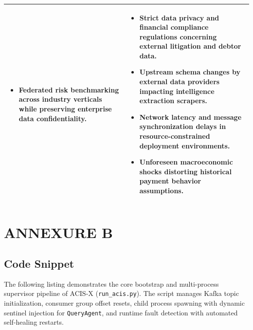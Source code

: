 \documentclass[a4paper, 12pt]{report}
\begin{document}
\begin{table}[H]
{\begin{tabular}{|p{7.3cm}|p{7.3cm}|}
\begin{itemize}[leftmargin=*, noitemsep, topsep=2pt, partopsep=0pt]
            \item Federated risk benchmarking across industry verticals while preserving enterprise data confidentiality.
        \end{itemize}
        &
        \begin{itemize}[leftmargin=*, noitemsep, topsep=2pt, partopsep=0pt]
            \item Strict data privacy and financial compliance regulations concerning external litigation and debtor data.
            \item Upstream schema changes by external data providers impacting intelligence extraction scrapers.
            \item Network latency and message synchronization delays in resource-constrained deployment environments.
            \item Unforeseen macroeconomic shocks distorting historical payment behavior assumptions.
        \end{itemize}
        \\[2pt]
        \hline
    \end{tabular}
    }
\end{table}

\clearpage
{}
\chapter*{ANNEXURE B}
\renewcommand{\thesection}{B.\arabic{section}}
\renewcommand{\theHsection}{AnnexB.\arabic{section}}
\setcounter{section}{0}

\section{Code Snippet}
The following listing demonstrates the core bootstrap and multi-process supervisor pipeline of ACIS-X (\texttt{run\_acis.py}). The script manages Kafka topic initialization, consumer group offset resets, child process spawning with dynamic sentinel injection for \texttt{QueryAgent}, and runtime fault detection with automated self-healing restarts.
\end{document}
